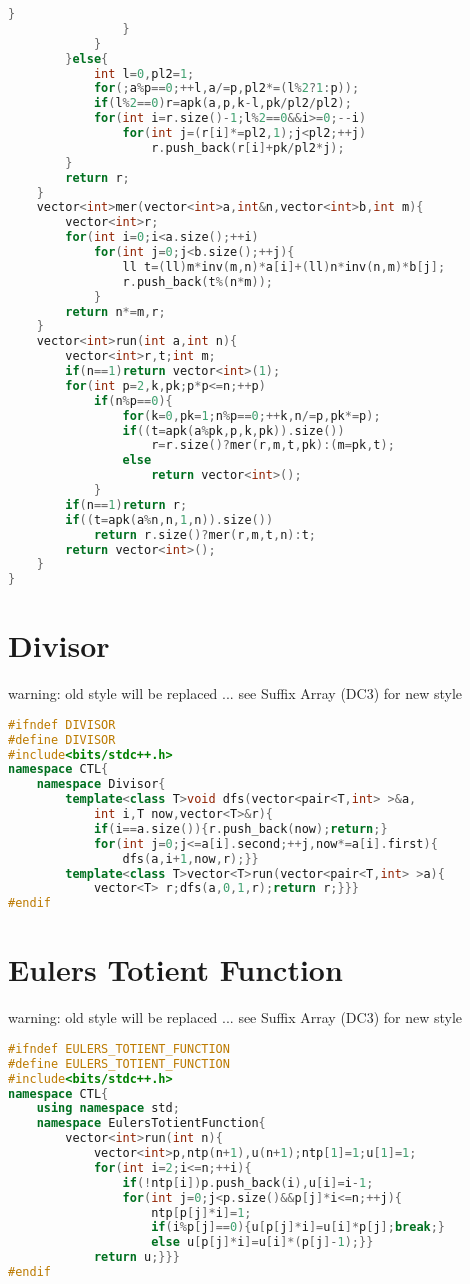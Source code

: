 \documentclass{book}
\begin{document}
\begin{lstlisting}[language=C++,title={Discrete Square Root.hpp (3692 bytes, 122 lines)}]
                    }
                }
            }
        }else{
            int l=0,pl2=1;
            for(;a%p==0;++l,a/=p,pl2*=(l%2?1:p));
            if(l%2==0)r=apk(a,p,k-l,pk/pl2/pl2);
            for(int i=r.size()-1;l%2==0&&i>=0;--i)
                for(int j=(r[i]*=pl2,1);j<pl2;++j)
                    r.push_back(r[i]+pk/pl2*j);
        }
        return r;
    }
    vector<int>mer(vector<int>a,int&n,vector<int>b,int m){
        vector<int>r;
        for(int i=0;i<a.size();++i)
            for(int j=0;j<b.size();++j){
                ll t=(ll)m*inv(m,n)*a[i]+(ll)n*inv(n,m)*b[j];
                r.push_back(t%(n*m));
            }
        return n*=m,r;
    }
    vector<int>run(int a,int n){
        vector<int>r,t;int m;
        if(n==1)return vector<int>(1);
        for(int p=2,k,pk;p*p<=n;++p)
            if(n%p==0){
                for(k=0,pk=1;n%p==0;++k,n/=p,pk*=p);
                if((t=apk(a%pk,p,k,pk)).size())
                    r=r.size()?mer(r,m,t,pk):(m=pk,t);
                else
                    return vector<int>();
            }
        if(n==1)return r;
        if((t=apk(a%n,n,1,n)).size())
            return r.size()?mer(r,m,t,n):t;
        return vector<int>();
    }
}
\end{lstlisting}
\section{Divisor}
warning: old style will be replaced ... see Suffix Array (DC3) for new style\begin{lstlisting}[language=C++,title={Divisor.hpp (471 bytes, 13 lines)}]
#ifndef DIVISOR
#define DIVISOR
#include<bits/stdc++.h>
namespace CTL{
    namespace Divisor{
        template<class T>void dfs(vector<pair<T,int> >&a,
            int i,T now,vector<T>&r){
            if(i==a.size()){r.push_back(now);return;}
            for(int j=0;j<=a[i].second;++j,now*=a[i].first){
                dfs(a,i+1,now,r);}}
        template<class T>vector<T>run(vector<pair<T,int> >a){
            vector<T> r;dfs(a,0,1,r);return r;}}}
#endif\end{lstlisting}
\section{Eulers Totient Function}
warning: old style will be replaced ... see Suffix Array (DC3) for new style\begin{lstlisting}[language=C++,title={Eulers Totient Function.hpp (592 bytes, 16 lines)}]
#ifndef EULERS_TOTIENT_FUNCTION
#define EULERS_TOTIENT_FUNCTION
#include<bits/stdc++.h>
namespace CTL{
    using namespace std;
    namespace EulersTotientFunction{
        vector<int>run(int n){
            vector<int>p,ntp(n+1),u(n+1);ntp[1]=1;u[1]=1;
            for(int i=2;i<=n;++i){
                if(!ntp[i])p.push_back(i),u[i]=i-1;
                for(int j=0;j<p.size()&&p[j]*i<=n;++j){
                    ntp[p[j]*i]=1;
                    if(i%p[j]==0){u[p[j]*i]=u[i]*p[j];break;}
                    else u[p[j]*i]=u[i]*(p[j]-1);}}
            return u;}}}
#endif\end{lstlisting}
\end{document}
